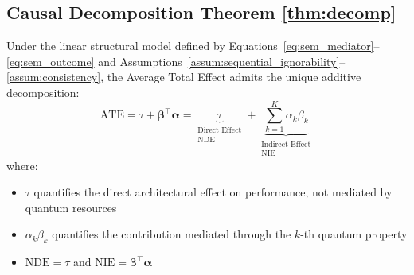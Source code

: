 \documentclass[
    reprint,
    amsmath, amssymb,
    aps,
    floatfix,
    nofootinbib
]{revtex4-1}
\begin{document}
\subsection{Causal Decomposition Theorem \ref{thm:decomp}}
Under the linear structural model defined by Equations~\eqref{eq:sem_mediator}--\eqref{eq:sem_outcome} and Assumptions~\ref{assum:sequential_ignorability}--\ref{assum:consistency}, the Average Total Effect admits the unique additive decomposition:
\begin{equation}
    \boxed{\text{ATE} = \tau + \bm{\beta}^\top\bm{\alpha} = \underbrace{\tau}_{\substack{\text{Direct Effect} \\ \text{NDE}}} + \underbrace{\sum_{k=1}^{K} \alpha_k\beta_k}_{\substack{\text{Indirect Effect} \\ \text{NIE}}}}
\end{equation}
where:
\begin{itemize}
    \item $\tau$ quantifies the direct architectural effect on performance, not mediated by quantum resources
    \item $\alpha_k\beta_k$ quantifies the contribution mediated through the $k$-th quantum property
    \item $\text{NDE} = \tau$ and $\text{NIE} = \bm{\beta}^\top\bm{\alpha}$
\end{itemize}
\end{document}

